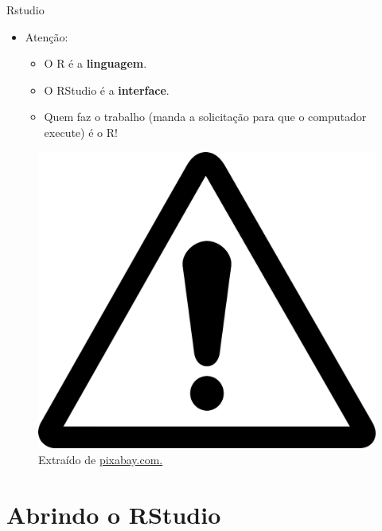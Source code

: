 \documentclass[
  ignorenonframetext,
  serif,
  professionalfont,
  usenames,
  dvipsnames,
  aspectratio = 169]{beamer}
\providecommand{\tightlist}{%
  \setlength{\itemsep}{0pt}\setlength{\parskip}{0pt}}
\renewcommand{\tightlist}{%
  \setlength{\itemsep}{0\baselineskip}
  \setlength{\parskip}{0.25\baselineskip}
}
\def\beginAHalfColumn{\begin{minipage}{0.49\textwidth}}%
\def\endColumns{\end{minipage}}%
\begin{document}
\begin{frame}{Rstudio}
\label{rstudio}
\beginAHalfColumn

\begin{itemize}
\tightlist
\item
  Atenção:

  \begin{itemize}
  \tightlist
  \item
    O R é a \textbf{linguagem}.
  \item
    O RStudio é a \textbf{interface}.
  \item
    Quem faz o trabalho (manda a solicitação para que o computador
    execute) é o R!
  \end{itemize}
\end{itemize}

\endColumns
\beginAHalfColumn

\begin{figure}

{\centering \includegraphics[width=0.6\linewidth]{./img/atencao} 

}

\caption{Extraído de \href{https://cdn.pixabay.com/photo/2013/04/01/10/57/exclamation-mark-98739_1280.png}{pixabay.com.}}\label{fig:unnamed-chunk-9}
\end{figure}

\endColumns
\end{frame}

\section{Abrindo o RStudio}\label{abrindo-o-rstudio}
\end{document}
